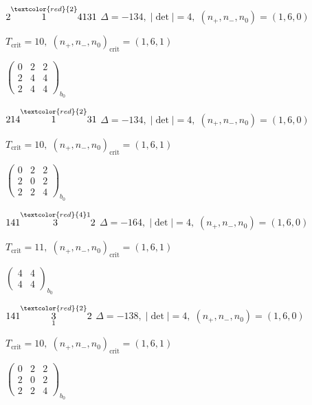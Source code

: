 \documentclass[10pt]{article}
\begin{document}
$2\overset{\textcolor{red}{2}}{1}4131$ \quad $\Delta=-134,\; |\det|=4,\; (n_+,n_-,n_0)=(1,6,0)$

\hspace{1em}$T_{\text{crit}}=10,\; (n_+,n_-,n_0)_{\text{crit}}=(1,6,1)$

\hspace{2em}$\left(\begin{smallmatrix}0 & 2 & 2 \\ 2 & 4 & 4 \\ 2 & 4 & 4\end{smallmatrix}\right)_{\!b_0}$

$214\overset{\textcolor{red}{2}}{1}31$ \quad $\Delta=-134,\; |\det|=4,\; (n_+,n_-,n_0)=(1,6,0)$

\hspace{1em}$T_{\text{crit}}=10,\; (n_+,n_-,n_0)_{\text{crit}}=(1,6,1)$

\hspace{2em}$\left(\begin{smallmatrix}0 & 2 & 2 \\ 2 & 0 & 2 \\ 2 & 2 & 4\end{smallmatrix}\right)_{\!b_0}$

\smallskip

$141\overset{\textcolor{red}{4}1}{3}2$ \quad $\Delta=-164,\; |\det|=4,\; (n_+,n_-,n_0)=(1,6,0)$

\hspace{1em}$T_{\text{crit}}=11,\; (n_+,n_-,n_0)_{\text{crit}}=(1,6,1)$

\hspace{2em}$\left(\begin{smallmatrix}4 & 4 \\ 4 & 4\end{smallmatrix}\right)_{\!b_0}$

$141\overset{\textcolor{red}{2}}{\underset{1}{3}}2$ \quad $\Delta=-138,\; |\det|=4,\; (n_+,n_-,n_0)=(1,6,0)$

\hspace{1em}$T_{\text{crit}}=10,\; (n_+,n_-,n_0)_{\text{crit}}=(1,6,1)$

\hspace{2em}$\left(\begin{smallmatrix}0 & 2 & 2 \\ 2 & 0 & 2 \\ 2 & 2 & 4\end{smallmatrix}\right)_{\!b_0}$
\end{document}
